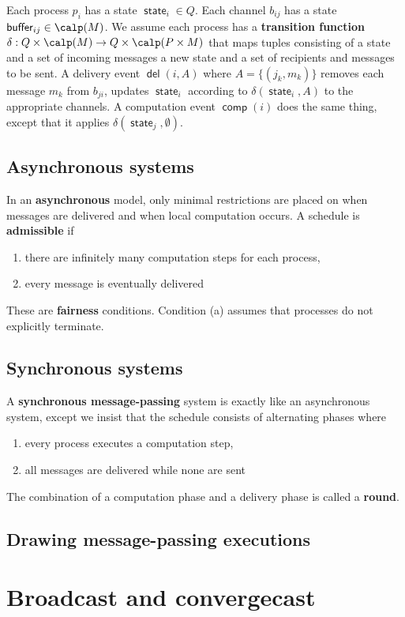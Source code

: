 \documentclass[11pt]{article}
\DeclareMathOperator{\state}{\textsf{state}}
\DeclareMathOperator{\buffer}{\textsf{buffer}}
\DeclareMathOperator{\del}{\textsf{del}}
\DeclareMathOperator{\comp}{\textsf{comp}}
\begin{document}
Each process \(p_i\) has a state \(\state_i\in Q\). Each channel \(b_{ij}\) has a state \(\buffer_{ij}\in\calp(M)\).
We assume each process has a \textbf{transition function} \(\delta:Q\times\calp(M)\to Q\times\calp(P\times M)\) that maps tuples consisting
of a state and a set of incoming messages a new state and a set of recipients and messages to be sent.
A delivery event \(\del(i,A)\) where \(A=\{(j_k,m_k)\}\) removes each message \(m_k\) from \(b_{ji}\),
updates \(\state_i\) according to \(\delta(\state_i,A)\) to the appropriate channels. A computation event \(\comp(i)\)
does the same thing, except that it applies \(\delta(\state_j,\emptyset)\).
\subsection{Asynchronous systems}
\label{sec:orgdfc976e}
In an \textbf{asynchronous} model, only minimal restrictions are placed on when messages are delivered and when
local computation occurs. A schedule is \textbf{admissible} if
\begin{enumerate}
\item there are infinitely many computation steps for each process,
\item every message is eventually delivered
\end{enumerate}
These are \textbf{fairness} conditions. Condition (a) assumes that processes do not explicitly terminate.
\subsection{Synchronous systems}
\label{sec:org2e96f46}
A \textbf{synchronous message-passing} system is exactly like an asynchronous system, except we insist that the
schedule consists of alternating phases where
\begin{enumerate}
\item every process executes a computation step,
\item all messages are delivered while none are sent
\end{enumerate}
The combination of a computation phase and a delivery phase is called a \textbf{round}.
\subsection{Drawing message-passing executions}
\label{sec:org9a4faf0}
\section{Broadcast and convergecast}
\label{sec:org3e168ba}
\end{document}
